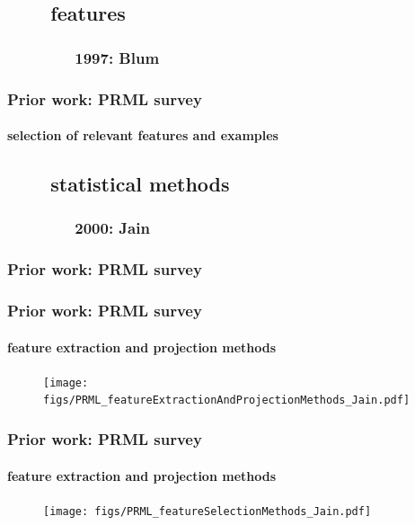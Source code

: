 \subsection{\ \ \ \ features}
\subsubsection{\ \ \ \ \ \ \ \ 1997: Blum}
\begin{frame}
\frametitle{Prior work: PRML survey}
\framesubtitle{selection of relevant features and examples}
\mypagenum
{}
\end{frame}

\subsection{\ \ \ \ statistical methods}
\subsubsection{\ \ \ \ \ \ \ \ 2000: Jain}
\begin{frame}
\frametitle{Prior work: PRML survey}
\framesubtitle{}
\mypagenum
{}
\end{frame}

\begin{frame}
\frametitle{Prior work: PRML survey}
\framesubtitle{feature extraction and projection methods}
\mypagenum
{}
	\begin{figure}				
		\texttt{[image: figs/PRML\_featureExtractionAndProjectionMethods\_Jain.pdf]}
	\end{figure}	
\end{frame}



\begin{frame}
\frametitle{Prior work: PRML survey}
\framesubtitle{feature extraction and projection methods}
\mypagenum
{}
	\begin{figure}				
		\texttt{[image: figs/PRML\_featureSelectionMethods\_Jain.pdf]}
	\end{figure}	
\end{frame}





